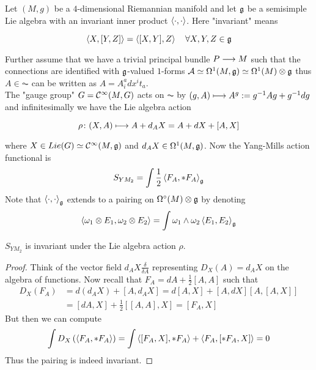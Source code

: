 \begin{example}
  Let $(M,g)$ be a $4$-dimensional Riemannian manifold and let $\mathfrak{g}$ be a semisimple Lie algebra with an invariant inner product $\left\langle \cdot , \cdot \right\rangle$. Here "invariant" means

  \begin{equation}
    \left\langle X , [Y,Z] \right\rangle = \left\langle [X,Y] , Z \right\rangle \quad \forall X,Y,Z \in \mathfrak{g}
  \end{equation}

  Further assume that we have a trivial principal bundle $P \longrightarrow M$ such that the connections are identified with $\mathfrak{g}$-valued $1$-forms $\mathcal{A} \simeq \Omega^1 (M, \mathfrak{g}) \simeq \Omega^1 (M) \otimes \mathfrak{g}$ thus $A \in \AC$ can be written as $A = A^a_i dx^i t_a$.\\
  The "gauge group" $G = \mathcal{C}^{\infty}(M, G)$ acts on $\AC$ by $(g, A) \longmapsto A^g := g^{-1} A g + g^{-1} dg$ and infinitesimally we have the Lie algebra action

  \begin{equation}
    \rho \colon (X,A) \longmapsto A + d_A X = A + dX + [A,X]
  \end{equation}

  where $X \in Lie(G) \simeq \mathcal{C}^{\infty}(M, \mathfrak{g})$ and $d_A X \in \Omega^1(M, \mathfrak{g})$. Now the Yang-Mills action functional is
  \begin{equation}
    S_{YM_2} = \int \frac{1}{2} \left\langle F_A , * F_A \right\rangle_{\mathfrak{g}}
  \end{equation}
  Note that $\left\langle \cdot , \cdot \right\rangle_{\mathfrak{g}}$ extends to a pairing on $\Omega^\circ(M) \otimes \mathfrak{g}$ by denoting
  \begin{equation}
    \left\langle \omega_1 \otimes E_1 , \omega_2 \otimes E_2 \right\rangle = \int \omega_1 \wedge \omega_2 \left\langle E_1 , E_2 \right\rangle_{\mathfrak{g}}
  \end{equation}

  \begin{lem}
    $S_{YM_2}$ is invariant under the Lie algebra action $\rho$.
  \begin{proof}
    Think of the vector field $d_A X \frac{\delta}{\delta A}$ representing $D_X(A) = d_A X$ on the algebra of functions. Now recall that $F_A = dA + \frac{1}{2} [A,A]$ such that
    \begin{align}
      D_X(F_A) &= d(d_A X) + [A, d_A X] = d[A,X] + [A,dX]
       [A,[A,X]]\\
       &= [dA,X] + \frac{1}{2}[[A,A], X] = [F_A, X]
    \end{align}
    But then we can compute
    \begin{align}
      \int D_X \left( \left\langle F_A , *F_A \right\rangle \right) = \int \left\langle [F_A, X] , *F_A \right\rangle + \left\langle F_A ,  [*F_A, X] \right\rangle = 0
    \end{align}
    Thus the pairing is indeed invariant.
  \end{proof}
  \end{lem}


\end{example}
